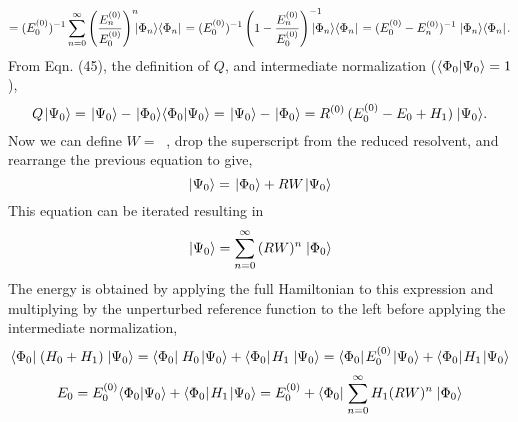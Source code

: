 \documentclass[thesis.tex]{subfiles}
\begin{document}
\begin{equation}
=\mathop{(E^{(0)}_{0})^{-1}}\sum_{n=0}^{\infty}\mathop{\left(\frac{E^{(0)}_{n}}{E^{(0)}_{0}}\right)^{n}}\hspace{-2mm}\ket{\Phi_{n}}\bra{\Phi_{n}}=\mathop{(E^{(0)}_{0})^{-1}}\mathop{\left(1-\frac{E^{(0)}_{n}}{E^{(0)}_{0}}\right)^{-1}}\hspace{-4mm}\ket{\Phi_{n}}\bra{\Phi_{n}}=\mathop{(E^{(0)}_{0}-E^{(0)}_{n})^{-1}}\ket{\Phi_{n}}\bra{\Phi_{n}}.
\end{equation}
From Eqn. (45), the definition of $Q$, and intermediate normalization ($\langle \Phi_{0} | \Psi_{0}\rangle=1$),
\begin{equation}
Q\hspace{1pt}| \Psi_{0} \rangle=\hspace{1pt}| \Psi_{0} \rangle-\hspace{1pt}| \Phi_{0} \rangle\langle \Phi_{0} | \Psi_{0}\rangle=\hspace{1pt}| \Psi_{0} \rangle-\hspace{1pt}| \Phi_{0} \rangle=R^{(0)}\mathop{(E^{(0)}_{0}-E_{0}+H_{1})}\hspace{1pt}| \Psi_{0} \rangle.
\end{equation}
Now we can define $W=\mathop{(E^{(0)}_{0}-E_{0}+H_{1})}$, drop the superscript from the reduced resolvent, and rearrange the previous equation to give,
\begin{equation}
\hspace{1pt}| \Psi_{0} \rangle=\hspace{1pt}| \Phi_{0} \rangle+RW\hspace{1pt}| \Psi_{0} \rangle
\end{equation}
This equation can be iterated resulting in
\begin{equation}
\hspace{1pt}| \Psi_{0} \rangle=\sum_{n=0}^{\infty}\mathop{(RW)^{n}}\hspace{1pt}| \Phi_{0} \rangle
\end{equation}
The energy is obtained by applying the full Hamiltonian to this expression and multiplying by the unperturbed reference function to the left before applying the intermediate normalization,
\begin{equation}
\langle \Phi_{0} |\hspace{1pt}\mathop{(H_{0}+H_{1})}\hspace{1pt}| \Psi_{0} \rangle=\langle \Phi_{0} |\hspace{1pt}\mathop{H_{0}\hspace{1pt}| \Psi_{0} \rangle+\langle \Phi_{0} |\hspace{1pt}H_{1}}\hspace{1pt}| \Psi_{0} \rangle=\langle \Phi_{0} |\hspace{1pt}E^{(0)}_{0}\hspace{1pt}| \Psi_{0} \rangle+\langle \Phi_{0} |\hspace{1pt}H_{1}\hspace{1pt}| \Psi_{0} \rangle
\end{equation}
\begin{equation}
E_{0}=E^{(0)}_{0}\langle \Phi_{0} | \Psi_{0}\rangle+\langle \Phi_{0} |\hspace{1pt}H_{1}\hspace{1pt}| \Psi_{0} \rangle=E^{(0)}_{0}+\langle \Phi_{0} |\hspace{1pt}\sum_{n=0}^{\infty}\mathop{H_{1}(RW)^{n}}\hspace{1pt}| \Phi_{0} \rangle
\end{equation}
\end{document}
